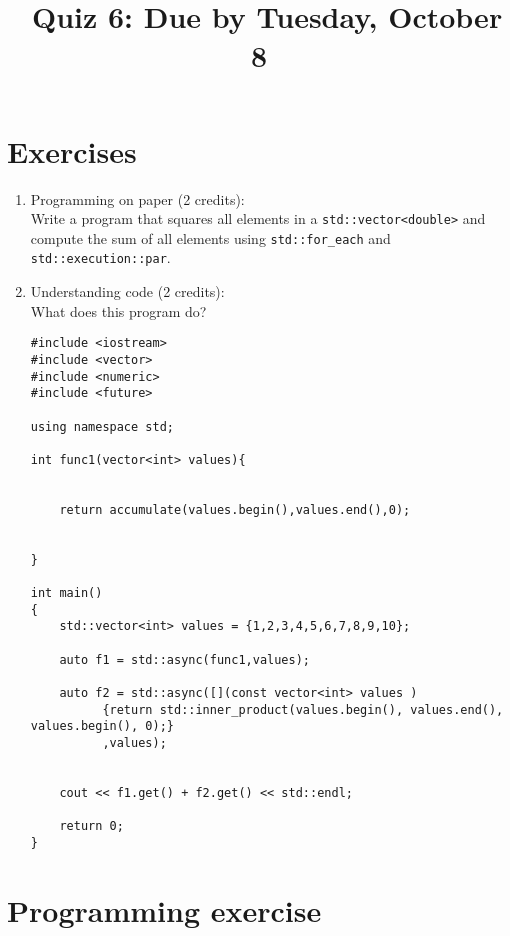 \documentclass[11pt]{article}
\begin{document}
\title{\coursename~Quiz 6: Due by Tuesday, October 8}
\date{}
\maketitle

\medskip


\section*{Exercises}

\begin{enumerate}
\item Programming on paper (2 credits): \\
Write a program that squares all elements in a \lstinline|std::vector<double>| and compute the sum of all elements using \lstinline|std::for_each| and \lstinline|std::execution::par|.


\item Understanding code (2 credits): \\
What does this program do?
\begin{lstlisting}
#include <iostream>
#include <vector>
#include <numeric>
#include <future>

using namespace std;

int func1(vector<int> values){
    
    
    return accumulate(values.begin(),values.end(),0);
    
    
}

int main()
{
    std::vector<int> values = {1,2,3,4,5,6,7,8,9,10};
    
    auto f1 = std::async(func1,values);
    
    auto f2 = std::async([](const vector<int> values )
          {return std::inner_product(values.begin(), values.end(), values.begin(), 0);}
          ,values);
    
    
    cout << f1.get() + f2.get() << std::endl;

    return 0;
}
\end{lstlisting}


\end{enumerate}

\section*{Programming exercise}
\end{document}
